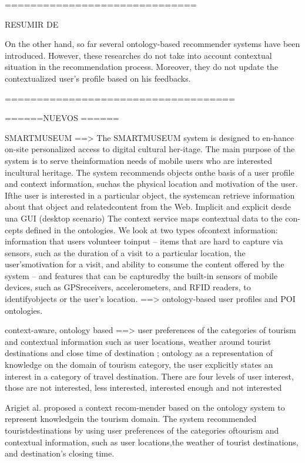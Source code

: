 ==============================

RESUMIR DE \cite{bahramian_abbaspour_claramunt_2017}


On  the other hand,  so  far  several  ontology-based  recommender systems  have  been  introduced. However,  these  researches  do  not take  into  account  contextual  situation  in the recommendation process. Moreover, they do not update the contextualized user’s profile based on his feedbacks.

====================================

======NUEVOS ======


 \cite{ruotsalo2013smartmuseum} SMARTMUSEUM ==> The  SMARTMUSEUM  system  is  designed  to  en-hance on-site personalized access to digital cultural her-itage.  The main purpose of the system is to serve theinformation needs of mobile users who are interested incultural heritage.  The system recommends objects onthe basis of a user profile and context information, suchas the physical location and motivation of the user.  Ifthe user is interested in a particular object, the systemcan  retrieve  information  about  that  object  and  relatedcontent  from  the  Web.
 Implicit and explicit desde una GUI (desktop scenario)
 The context service maps contextual data to the con-cepts defined in the ontologies. We look at two types ofcontext information: information that users volunteer toinput – items that are hard to capture via sensors, such as the duration of a visit to a particular location, the user’smotivation for a visit, and ability to consume the content
 offered by the system – and features that can be capturedby the built-in sensors of mobile devices, such as GPSreceivers, accelerometers, and RFID readers, to identifyobjects or the user’s location. ==> ontology-based user profiles and POI ontologies.
 
 


\cite{arigi2018context} context-aware, ontology based
==> user  preferences  of  the  categories  of  tourism  and contextual information such as user locations, weather around tourist destinations and close time of   destination ; ontology as a representation of knowledge on the domain of tourism  category, the  user explicitly  states  an interest in a category of travel destination. There are four levels of user interest, those are not interested, less interested, interested enough and not interested

Arigiet al. \cite{arigi2018context} proposed a context recom-mender based on the ontology system to represent knowledgein the tourism domain. The system recommended touristdestinations by using user preferences of the categories oftourism and contextual information, such as user locations,the weather of tourist destinations, and destination’s closing time.



